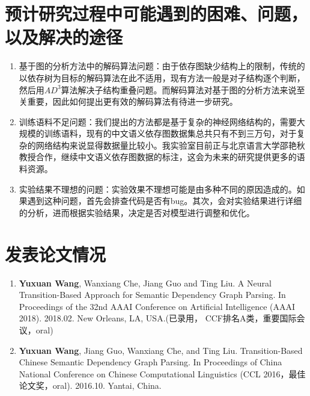 \section{预计研究过程中可能遇到的困难、问题，以及解决的途径}

\begin{enumerate}
	\item 基于图的分析方法中的解码算法问题：由于依存图缺少结构上的限制，传统的以依存树为目标的解码算法在此不适用，现有方法一般是对子结构逐个判断，然后用$AD^3$算法解决子结构重叠问题。而解码算法对基于图的分析方法来说至关重要，因此如何提出更有效的解码算法有待进一步研究。
	\item 训练语料不足问题：我们提出的方法都是基于复杂的神经网络结构的，需要大规模的训练语料，现有的中文语义依存图数据集总共只有不到三万句，对于复杂的网络结构来说显得数据量比较小。我实验室目前正与北京语言大学邵艳秋教授合作，继续中文语义依存图数据的标注，这会为未来的研究提供更多的语料资源。
	\item 实验结果不理想的问题：实验效果不理想可能是由多种不同的原因造成的。如果遇到这种问题，首先会排查代码是否有bug。其次，会对实验结果进行详细的分析，进而根据实验结果，决定是否对模型进行调整和优化。
\end{enumerate}

\section{发表论文情况}
\begin{enumerate}
	\item \textbf{Yuxuan Wang}, Wanxiang Che, Jiang Guo and Ting Liu. A Neural Transition-Based Approach for Semantic Dependency Graph Parsing. In Proceedings of the 32nd AAAI Conference on Artificial Intelligence (AAAI 2018). 2018.02. New Orleans, LA, USA.(已录用， CCF排名A类，重要国际会议，oral)
	\item \textbf{Yuxuan Wang}, Jiang Guo,  Wanxiang Che, and Ting Liu. Transition-Based Chinese Semantic Dependency Graph Parsing. In Proceedings of China National Conference on Chinese Computational Linguistics (CCL 2016，最佳论文奖，oral). 2016.10. Yantai, China.
\end{enumerate}

\clearpage

\newpage